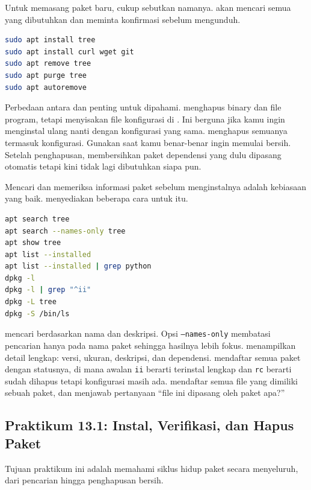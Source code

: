 Untuk memasang paket baru, cukup sebutkan namanya.  akan mencari
semua yang dibutuhkan dan meminta konfirmasi sebelum mengunduh.

\begin{lstlisting}[language=bash, caption={Instalasi dan penghapusan paket}]
sudo apt install tree
sudo apt install curl wget git
sudo apt remove tree
sudo apt purge tree
sudo apt autoremove
\end{lstlisting}

Perbedaan antara  dan  penting untuk dipahami.
 menghapus binary dan file program, tetapi menyisakan file
konfigurasi di . Ini berguna jika kamu ingin menginstal ulang
nanti dengan konfigurasi yang sama.  menghapus semuanya termasuk
konfigurasi. Gunakan  saat kamu benar-benar ingin memulai bersih.
Setelah penghapusan,  membersihkan paket dependensi yang dulu
dipasang otomatis tetapi kini tidak lagi dibutuhkan siapa pun.

Mencari dan memeriksa informasi paket sebelum menginstalnya adalah kebiasaan
yang baik.  menyediakan beberapa cara untuk itu.

\begin{lstlisting}[language=bash, caption={Mencari dan memeriksa informasi paket}]
apt search tree
apt search --names-only tree
apt show tree
apt list --installed
apt list --installed | grep python
dpkg -l
dpkg -l | grep "^ii"
dpkg -L tree
dpkg -S /bin/ls
\end{lstlisting}

 mencari berdasarkan nama dan deskripsi. Opsi
\texttt{--names-only} membatasi pencarian hanya pada nama paket sehingga
hasilnya lebih fokus.  menampilkan detail lengkap: versi, ukuran,
deskripsi, dan dependensi.  mendaftar semua paket dengan statusnya,
di mana awalan \texttt{ii} berarti terinstal lengkap dan \texttt{rc} berarti
sudah dihapus tetapi konfigurasi masih ada.  mendaftar semua file
yang dimiliki sebuah paket, dan  menjawab pertanyaan ``file ini
dipasang oleh paket apa?''

\subsection*{Praktikum 13.1: Instal, Verifikasi, dan Hapus Paket}

Tujuan praktikum ini adalah memahami siklus hidup paket secara menyeluruh,
dari pencarian hingga penghapusan bersih.

